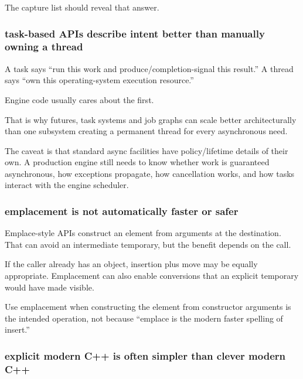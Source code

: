 The capture list should reveal that answer.

\subsubsection{task-based APIs describe intent better than manually owning a thread}\label{01-foundations-i-ch005-task-based-apis-describe-intent-better-than-manually-owning-a-thread}

\hypertarget{01-foundations-i-ch005-task-based-apis-describe-intent-better-than-manually-owning-a-thread}{}

A task says ``run this work and produce/completion-signal this result.'' A thread says ``own this operating-system execution resource.''

Engine code usually cares about the first.

That is why futures, task systems and job graphs can scale better architecturally than one subsystem creating a permanent thread for every asynchronous need.

The caveat is that standard async facilities have policy/lifetime details of their own. A production engine still needs to know whether work is guaranteed asynchronous, how exceptions propagate, how cancellation works, and how tasks interact with the engine scheduler.

\subsubsection{emplacement is not automatically faster or safer}\label{01-foundations-i-ch005-emplacement-is-not-automatically-faster-or-safer}

\hypertarget{01-foundations-i-ch005-emplacement-is-not-automatically-faster-or-safer}{}

Emplace-style APIs construct an element from arguments at the destination. That can avoid an intermediate temporary, but the benefit depends on the call.

If the caller already has an object, insertion plus move may be equally appropriate. Emplacement can also enable conversions that an explicit temporary would have made visible.

Use emplacement when constructing the element from constructor arguments is the intended operation, not because ``emplace is the modern faster spelling of insert.''

\subsubsection{explicit modern C++ is often simpler than clever modern C++}\label{01-foundations-i-ch005-explicit-modern-c-is-often-simpler-than-clever-modern-c}

